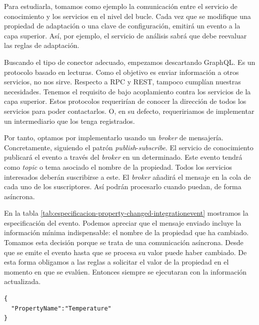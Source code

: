 Para estudiarla, tomamos como ejemplo la comunicación entre el servicio de conocimiento y los servicios en el nivel del bucle. Cada vez que se modifique una propiedad de adaptación o una clave de configuración, emitirá un evento a la capa superior. Así, por ejemplo, el servicio de análisis sabrá que debe reevaluar las reglas de adaptación.

Buscando el tipo de conector adecuado, empezamos descartando GraphQL. Es un protocolo basado en lecturas. Como el objetivo es enviar información a otros servicios, no nos sirve. Respecto a RPC y REST, tampoco cumplían nuestras necesidades. Tenemos el requisito de bajo acoplamiento contra los servicios de la capa superior. Estos protocolos requerirían de conocer la dirección de todos los servicios para poder contactarlos. O, en su defecto, requeririamos de implementar un intermediario que los tenga registrados.

Por tanto, optamos por implementarlo usando un \emph{broker} de mensajería. Concretamente, siguiendo el patrón \emph{publish}-\emph{subscribe}. El servicio de conocimiento publicará el evento a través del \emph{broker} en un  determinado. Este evento tendrá como \emph{topic} o tema asociado el nombre de la propiedad. Todos los servicios interesados deberán suscribirse a este. El \emph{broker} añadirá el mensaje en la cola de cada uno de los suscriptores. Así podrán procesarlo cuando puedan, de forma asíncrona.

En la tabla \ref{tab:especificacion-property-changed-integrationevent} mostramos la especificación del evento. Podemos apreciar que el mensaje enviado incluye la información mínima indispensable: el nombre de la propiedad que ha cambiado. Tomamos esta decisión porque se trata de una comunicación asíncrona. Desde que se emite el evento hasta que se procesa su valor puede haber cambiado. De esta forma obligamos a las reglas a solicitar el valor de la propiedad en el momento en que se evalúen. Entonces siempre se ejecutaran con la información actualizada.

\newsavebox\propertychangedeventbox
\begin{lrbox}{\propertychangedeventbox}
  \begin{minipage}[t]{2in}
    \begin{verbatim}
{
  "PropertyName":"Temperature"
}
        \end{verbatim}
  \end{minipage}
\end{lrbox}

